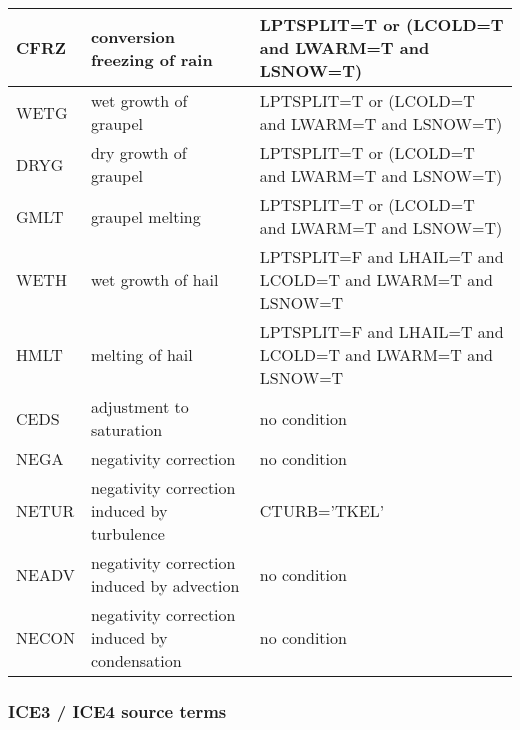 \begin{longtable} {|p{}|p{}|p{}|}
CFRZ   & conversion freezing of rain                   & LPTSPLIT=T or (LCOLD=T and LWARM=T and LSNOW=T) \\\hline
WETG   & wet growth of graupel                         & LPTSPLIT=T or (LCOLD=T and LWARM=T and LSNOW=T) \\\hline
DRYG   & dry growth of graupel                         & LPTSPLIT=T or (LCOLD=T and LWARM=T and LSNOW=T) \\\hline
GMLT   & graupel melting                               & LPTSPLIT=T or (LCOLD=T and LWARM=T and LSNOW=T) \\\hline
WETH   & wet growth of hail                            & LPTSPLIT=F and LHAIL=T and LCOLD=T and LWARM=T and LSNOW=T \\\hline
HMLT   & melting of hail                               & LPTSPLIT=F and LHAIL=T and LCOLD=T and LWARM=T and LSNOW=T \\\hline
CEDS   & adjustment to saturation                      & no condition \\\hline
NEGA   & negativity correction                         & no condition \\\hline
NETUR  & negativity correction induced by turbulence   & CTURB='TKEL' \\\hline
NEADV  & negativity correction induced by advection    & no condition \\\hline
NECON  & negativity correction induced by condensation & no condition \\\hline
\end{longtable}

\subsubsection{ICE3 / ICE4 source terms}

